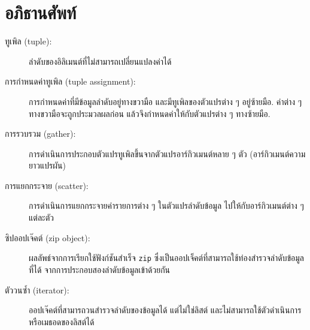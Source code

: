\section{อภิธานศัพท์}

\begin{description}

\item[ทูเพิล (tuple):] 
ลำดับของอิลิเมนต์ที่ไม่สามารถเปลี่ยนแปลงค่าได้

\item[การกำหนดค่าทูเพิล (tuple assignment):] 
การกำหนดค่าที่มีข้อมูลลำดับอยู่ทางขวามือ
และมีทูเพิลของตัวแปรต่าง ๆ อยู่ซ้ายมือ.
ค่าต่าง ๆ ทางขวามือจะถูกประมวลผลก่อน แล้วจึงกำหนดค่าให้กับตัวแปรต่าง ๆ ทางซ้ายมือ.
%

\item[การรวบรวม (gather):] 
การดำเนินการประกอบตัวแปรทูเพิลขึ้นจากตัวแปรอาร์กิวเมนต์หลาย ๆ ตัว (อาร์กิวเมนต์ความยาวแปรผัน)

\item[การแยกกระจาย (scatter):] 
การดำเนินการแยกกระจายค่ารายการต่าง ๆ ในตัวแปรลำดับข้อมูล
ไปให้กับอาร์กิวเมนต์ต่าง ๆ แต่ละตัว

\item[ซิปออปเจ๊คต์ (zip object):] 
ผลลัพธ์จากการเรียกใช้ฟังก์ชันสำเร็จ \texttt{zip}
ซึ่งเป็นออปเจ็คต์ที่สามารถใช้ท่องสำรวจลำดับข้อมูลที่ได้
จากการประกอบสองลำดับข้อมูลเข้าด้วยกัน

\item[ตัววนซ้ำ (iterator):] 
ออปเจ๊คต์ที่สามารถวนสำรวจลำดับของข้อมูลได้
แต่ไม่ใช่ลิสต์ และไม่สามารถใช้ตัวดำเนินการหรือเมธอดของลิสต์ได้


\end{description}
